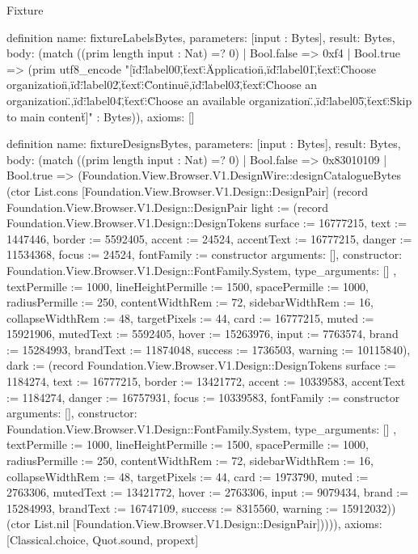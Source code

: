 \begin{lexlean}{Fixture}
\begin{semanticmodule}
definition{
  name: fixtureLabelsBytes,
  parameters: [input : Bytes],
  result: Bytes,
  body: (match ((prim length input : Nat) =? 0)
    | Bool.false => 0xf4
    | Bool.true => (prim utf8_encode "[{\"id\":\"label00\",\"text\":\"Application\"},{\"id\":\"label01\",\"text\":\"Choose organization\"},{\"id\":\"label02\",\"text\":\"Continue\"},{\"id\":\"label03\",\"text\":\"Choose an organization.\"},{\"id\":\"label04\",\"text\":\"Choose an available organization.\"},{\"id\":\"label05\",\"text\":\"Skip to main content\"}]" : Bytes)),
  axioms: []
}

definition{
  name: fixtureDesignsBytes,
  parameters: [input : Bytes],
  result: Bytes,
  body: (match ((prim length input : Nat) =? 0)
    | Bool.false => 0x83010109
    | Bool.true => (Foundation.View.Browser.V1.DesignWire::designCatalogueBytes (ctor List.cons [Foundation.View.Browser.V1.Design::DesignPair] (record Foundation.View.Browser.V1.Design::DesignPair {light := (record Foundation.View.Browser.V1.Design::DesignTokens {surface := 16777215, text := 1447446, border := 5592405, accent := 24524, accentText := 16777215, danger := 11534368, focus := 24524, fontFamily := constructor{
      arguments: [],
      constructor: Foundation.View.Browser.V1.Design::FontFamily.System,
      type_arguments: []
    }, textPermille := 1000, lineHeightPermille := 1500, spacePermille := 1000, radiusPermille := 250, contentWidthRem := 72, sidebarWidthRem := 16, collapseWidthRem := 48, targetPixels := 44, card := 16777215, muted := 15921906, mutedText := 5592405, hover := 15263976, input := 7763574, brand := 15284993, brandText := 11874048, success := 1736503, warning := 10115840}), dark := (record Foundation.View.Browser.V1.Design::DesignTokens {surface := 1184274, text := 16777215, border := 13421772, accent := 10339583, accentText := 1184274, danger := 16757931, focus := 10339583, fontFamily := constructor{
      arguments: [],
      constructor: Foundation.View.Browser.V1.Design::FontFamily.System,
      type_arguments: []
    }, textPermille := 1000, lineHeightPermille := 1500, spacePermille := 1000, radiusPermille := 250, contentWidthRem := 72, sidebarWidthRem := 16, collapseWidthRem := 48, targetPixels := 44, card := 1973790, muted := 2763306, mutedText := 13421772, hover := 2763306, input := 9079434, brand := 15284993, brandText := 16747109, success := 8315560, warning := 15912032})}) (ctor List.nil [Foundation.View.Browser.V1.Design::DesignPair])))),
  axioms: [Classical.choice, Quot.sound, propext]
}


\end{semanticmodule}
\end{lexlean}
